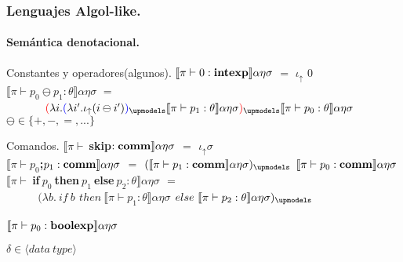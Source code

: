 \documentclass{beamer} %
\newcommand{\semBrcks}[1]{\llbracket #1 \rrbracket}
\newcommand{\angles}[1]{\langle #1 \rangle}
\newcommand{\boolexp}{\bf{boolexp}}
\newcommand{\intexp}{{\bf intexp}}
\newcommand{\comm}{\bf{comm}}
\newcommand{\cskip}{$\bf{skip}$}
\newcommand{\ifthenelse}[3]{\ $\bf{if}$ \ #1 \ $\bf{then}$ \ #2 \ $\bf{else}$ \ #3}
\newcommand{\seq}[2]{#1 $;$ #2}
\newcommand{\denotalsem}[5]{\semBrcks{#1 \vdash #2} #3 #4 #5}
\newcommand{\iotabot}{\iota_{\uparrow}}
\newcommand{\parentcolor}[2]{\textcolor{#1}{(} #2 \textcolor{#1}{)}}
\begin{document}
\begin{frame}[shrink=1]
\frametitle{Lenguajes Algol-like.}
\framesubtitle{Sem\'antica denotacional.}

\begin{block}{Constantes y operadores(algunos).}
$\denotalsem{\pi}{0:\intexp}{\alpha}{\eta}{\sigma}$ $=$ $\iotabot$ $0$\\


$\denotalsem{\pi}{p_{0} \ominus p_{1} : \theta}{\alpha}{\eta}{\sigma}$ $=$ \\
\ \ \ \ \ \ \ $\parentcolor{red}{\lambda i . \parentcolor{blue}{\lambda i' . \iotabot (i \ominus i')}_{\upmodels}
\denotalsem{\pi}{p_1:\theta}{\alpha}{\eta}{\sigma}}_{\upmodels}
\denotalsem{\pi}{p_0:\theta}{\alpha}{\eta}{\sigma}$\\

$\ominus \in \{+, -, =, ...\}$
\end{block}

\begin{block}{Comandos.}\small
$\denotalsem{\pi}{\ \cskip : \comm}{\alpha}{\eta}{\sigma}$ $=$ $\iotabot \sigma$\\
$\denotalsem{\pi}{ \seq{p_0}{p_1} : \comm}{\alpha}{\eta}{\sigma}$ $=$ 
$(\denotalsem{\pi}{p_1:\comm}{\alpha}{\eta}{\sigma})_{\upmodels}$ 
$\denotalsem{\pi}{p_0:\comm}{\alpha}{\eta}{\sigma}$\\
$\denotalsem{\pi}{\ifthenelse{p_0}{p_1}{p_2}:\theta}{\alpha}{\eta}{\sigma}$ $=$ \\
\ \ \ \ \ $(\lambda b . \ if \ b $
$then \ \denotalsem{\pi}{p_1:\theta}{\alpha}{\eta}{\sigma}$
$else \ \denotalsem{\pi}{p_2:\theta}{\alpha}{\eta}{\sigma})_{\upmodels}$ \\
\ \ \ \ \ \ \ \ \ \ \ \ \ \ \ \ \ \ \ \ \ \ \ \ \ \ \ \ \ \ \ \ \ \ \ \ \ \ \ \ \ \ \ \ \ \ \ \ \ \ \ \ \ \ \ \ 
$\denotalsem{\pi}{p_0:\boolexp}{\alpha}{\eta}{\sigma}$
\end{block}
$\delta \in \angles{data \ type}$
\end{frame}
\end{document}
